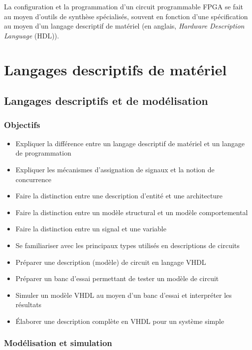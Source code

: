 \documentclass[letter, oneside]{book}
\begin{document}
La configuration et la programmation d'un circuit programmable FPGA se
fait au moyen d'outils de synthèse spécialisés, souvent en fonction
d'une spécification au moyen d'un langage descriptif de matériel (en
anglais, \emph{Hardware Description Language} (HDL)).

\part{Langages descriptifs de matériel}
\label{sec:org1357455}
\chapter{Langages descriptifs et de modélisation}
\label{sec:org90bc1f0}

\section{Objectifs}
\label{sec:orgfd7c29f}
\begin{itemize}
\item Expliquer la différence entre un langage descriptif de matériel et
un langage de programmation
\item Expliquer les mécanismes d'assignation de signaux et la notion de concurrence
\item Faire la distinction entre une description d'entité et une architecture
\item Faire la distinction entre un modèle structural et un modèle
comportemental
\item Faire la distinction entre un signal et une variable
\item Se familiariser avec les principaux types utilisés en descriptions
de circuits
\item Préparer une description (modèle) de circuit en langage VHDL
\item Préparer un banc d'essai permettant de tester un modèle de circuit
\item Simuler un modèle VHDL au moyen d'un banc d'essai et interpréter les
résultats
\item Élaborer une description complète en VHDL pour un système simple
\end{itemize}


\section{Modélisation et simulation}
\label{sec:orge2a5f69}
\end{document}
